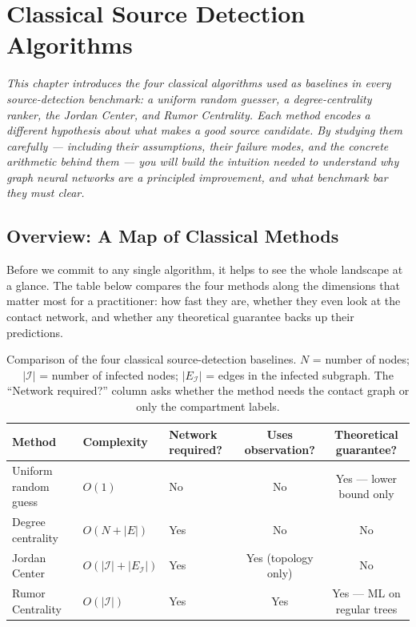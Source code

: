 \chapter{Classical Source Detection Algorithms}
\label{ch:classical}

\textit{This chapter introduces the four classical algorithms used as baselines in every
source-detection benchmark: a uniform random guesser, a degree-centrality ranker, the
Jordan Center, and Rumor Centrality. Each method encodes a different hypothesis about
what makes a good source candidate. By studying them carefully --- including their
assumptions, their failure modes, and the concrete arithmetic behind them --- you will
build the intuition needed to understand why graph neural networks are a principled
improvement, and what benchmark bar they must clear.}

\section{Overview: A Map of Classical Methods}
\label{sec:classical-overview}

Before we commit to any single algorithm, it helps to see the whole landscape at a
glance. The table below compares the four methods along the dimensions that matter most
for a practitioner: how fast they are, whether they even look at the contact network,
and whether any theoretical guarantee backs up their predictions.

\begin{table}[H]
\centering
\caption{Comparison of the four classical source-detection baselines. $N$ = number of
nodes; $|\mathcal{I}|$ = number of infected nodes; $|E_{\mathcal{I}}|$ = edges in the
infected subgraph. The ``Network required?'' column asks whether the method needs the
contact graph or only the compartment labels.}
\label{tab:classical-overview}
\small
\begin{tabular}{lllcc}
\toprule
\textbf{Method} & \textbf{Complexity} & \textbf{Network required?} &
  \textbf{Uses observation?} & \textbf{Theoretical guarantee?} \\
\midrule
Uniform random guess & $O(1)$          & No  & No  & Yes --- lower bound only \\
Degree centrality    & $O(N + |E|)$    & Yes & No  & No                      \\
Jordan Center        & $O(|\mathcal{I}| + |E_{\mathcal{I}}|)$
                                       & Yes & Yes (topology only) & No     \\
Rumor Centrality     & $O(|\mathcal{I}|)$ & Yes & Yes & Yes --- ML on regular trees \\
\bottomrule
\end{tabular}
\end{table}

